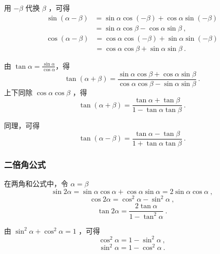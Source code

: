 用 $-\beta$ 代换 $\beta$ ，可得
\begin{equation}
\begin{aligned}
\sin(\alpha-\beta) &= \sin\alpha \cos(-\beta) + \cos\alpha \sin(-\beta)\\
&=\sin\alpha \cos\beta - \cos\alpha \sin\beta~,
\end{aligned}
\end{equation}
\begin{equation}
\begin{aligned}
\cos(\alpha-\beta) &= \cos\alpha \cos(-\beta) + \sin\alpha \sin(-\beta)\\
&=\cos\alpha \cos\beta + \sin\alpha \sin\beta~.
\end{aligned}
\end{equation}

由 $\tan\alpha = \frac{\sin\alpha}{\cos\alpha}$，得
\begin{equation}
\tan(\alpha+\beta) = \frac{\sin\alpha \cos\beta + \cos\alpha \sin\beta}{\cos\alpha \cos\beta - \sin\alpha \sin\beta}~.
\end{equation}
上下同除 $\cos\alpha\cos\beta$ ，得
\begin{equation}
\tan(\alpha+\beta) = \frac{\tan\alpha+\tan\beta}{1 - \tan\alpha\tan\beta}~.
\end{equation}

同理，可得
\begin{equation}
\tan(\alpha-\beta) = \frac{\tan\alpha - \tan\beta}{1 + \tan\alpha\tan\beta}~.
\end{equation}

\subsubsection{二倍角公式}
在两角和公式中，令 $\alpha = \beta$
\begin{equation}
\sin2\alpha = \sin\alpha \cos\alpha+\cos\alpha \sin\alpha = 2\sin\alpha \cos\alpha~,
\end{equation}
\begin{equation}
\cos2\alpha = \cos^2\alpha - \sin^2\alpha~,
\end{equation}
\begin{equation}
\tan2\alpha = \frac{2\tan\alpha}{1 - \tan^2\alpha}~.
\end{equation}

由 $\sin^2\alpha + \cos^2\alpha = 1$ ，可得
\begin{equation}
\cos^2\alpha = 1 - \sin^2\alpha~,
\end{equation}
\begin{equation}
\sin^2\alpha = 1 - \cos^2\alpha~.
\end{equation}

